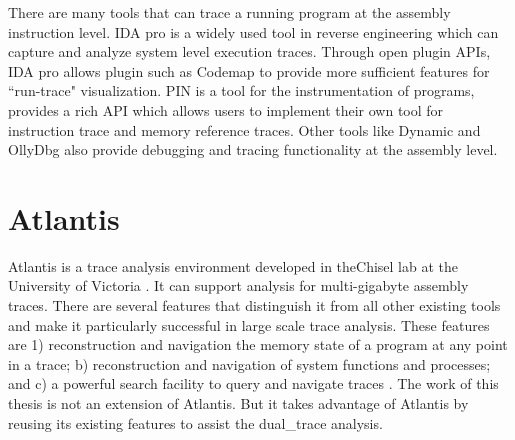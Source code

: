 There are many tools that can trace a running program at the assembly instruction level.  IDA pro \cite{eagle_ida_2008} is a widely used tool in reverse engineering which can capture and analyze system level execution traces. Through open plugin APIs, IDA pro allows plugin such as Codemap \cite{_c0demap/codemap:_????} to provide more sufficient features for ``run-trace" visualization. PIN \cite{_pin_????} is a tool for the instrumentation of programs, provides a rich API which allows users to implement their own tool for instruction trace and memory reference traces. Other tools like Dynamic \cite{brueningqz} and OllyDbg \cite{yuschuk2007ollydbg} also provide debugging and tracing functionality at the assembly level. 

\section{Atlantis}
Atlantis is a trace analysis environment developed in theChisel lab at the University of Victoria \cite{huang2017atlantis}. It can support analysis for multi-gigabyte assembly traces. There are several features that distinguish it from all other existing tools and make it particularly successful in large scale trace analysis. These features are 1) reconstruction and navigation the memory state of a program at any point in a trace; b) reconstruction and navigation of system functions and processes; and c) a powerful search facility to query and navigate traces \cite{huang2017atlantis}. The work of this thesis is not an extension of Atlantis. But it takes advantage of Atlantis by reusing its existing features to assist the dual\_trace analysis.




